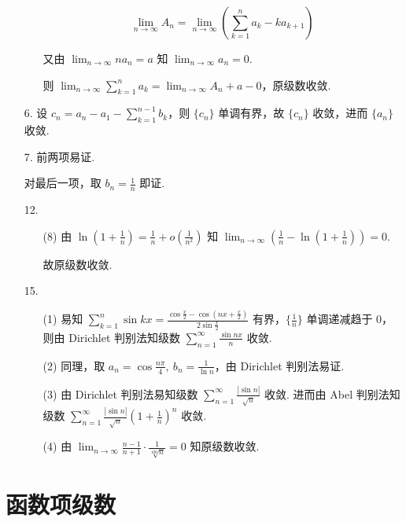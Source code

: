 \documentclass[oneside]{ctexbook} %
\begin{document}
\begin{enumerate}
\begin{enumerate}
        $$
        \lim_{n \to \infty} A_n = \lim_{n \to \infty} \left( \sum_{k=1}^n a_k - ka_{k+1} \right)
        $$
        
        又由 $\displaystyle \lim_{n \to \infty} n a_n = a$ 知 $\displaystyle \lim_{n \to \infty} a_n = 0$.
        
        则 $\lim_{n \to \infty} \sum_{k=1}^n a_k = \lim_{n \to \infty} A_n + a - 0$，原级数收敛.
    \end{enumerate}
    \item[6.]
    设 $\displaystyle c_n = a_n - a_1 - \sum_{k=1}^{n-1} b_k$，则 $\{ c_n \}$ 单调有界，故 $\{ c_n \}$ 收敛，进而 $\{ a_n \}$ 收敛.
    \item[7.]
    前两项易证.

    对最后一项，取 $b_n = \frac 1 n$ 即证.
    \item[12.]
    \begin{enumerate}
        \item[(8)]
        由 $\ln\left( 1 + \frac 1 n \right) = \frac 1 n + o \left( \frac 1 {n^2} \right)$ 知 $\displaystyle \lim_{n \to \infty} \left( \frac 1 n - \ln \left( 1 + \frac 1 n \right) \right) = 0$.

        故原级数收敛.
    \end{enumerate}
    \item[15.]
    \begin{enumerate}
        \item[(1)]
        易知 $\displaystyle \sum_{k=1}^n \sin kx = \frac{\cos \frac x 2 - \cos \left( nx + \frac x 2 \right)}{2 \sin \frac x 2}$ 有界，$\{ \frac 1 n \}$ 单调递减趋于 $0$，则由 Dirichlet 判别法知级数 $\displaystyle \sum_{n=1}^{\infty} \frac {\sin nx} n$ 收敛.
        \item[(2)]
        同理，取 $a_n = \cos \frac {n \pi} 4,\ b_n = \frac 1 {\ln n}$，由 Dirichlet 判别法易证.
        \item[(3)]
        由 Dirichlet 判别法易知级数 $\displaystyle \sum_{n=1}^{\infty} \frac{|\sin n|}{\sqrt n}$ 收敛.
        进而由 Abel 判别法知级数 $\displaystyle \sum_{n=1}^{\infty} \frac{|\sin n|}{\sqrt n} \left( 1 + \frac 1 n \right)^n$ 收敛.
        \item[(4)]
        由 $\displaystyle \lim_{n \to \infty} \frac{n-1}{n+1} \cdot \frac 1 {\sqrt[100]{n}} = 0$ 知原级数收敛.
    \end{enumerate}
\end{enumerate}

\section{函数项级数}
\end{document}
